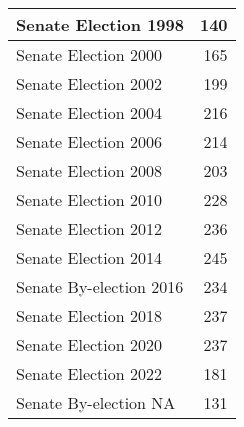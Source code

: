 \begin{tabular}{l|r}
\hline
Senate Election 1998 & 140\\
\hline
Senate Election 2000 & 165\\
\hline
Senate Election 2002 & 199\\
\hline
Senate Election 2004 & 216\\
\hline
Senate Election 2006 & 214\\
\hline
Senate Election 2008 & 203\\
\hline
Senate Election 2010 & 228\\
\hline
Senate Election 2012 & 236\\
\hline
Senate Election 2014 & 245\\
\hline
Senate By-election 2016 & 234\\
\hline
Senate Election 2018 & 237\\
\hline
Senate Election 2020 & 237\\
\hline
Senate Election 2022 & 181\\
\hline
Senate By-election NA & 131\\
\hline
\end{tabular}
